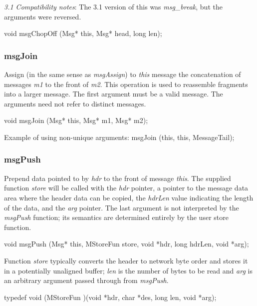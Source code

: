 {\em 3.1 Compatibility notes}:
The 3.1 version of this was {\em msg\_break}, but the arguments were reversed.
\medskip

{\sem void} {\bold msgChopOff} ({\sem Msg*} {\caps this}, {\sem Msg*} {\caps head}, {\sem long} {\caps len});
\medskip

\subsubsection{msgJoin}

Assign (in the same sense as {\em msgAssign}) 
to {\em this} message the concatenation of messages {\em m1}
to the front of {\em m2}. This operation is used to reassemble fragments
into a larger message.  The first argument must be a valid message.  The
arguments need not refer to distinct messages.
\medskip

{\sem void} {\bold msgJoin} ({\sem Msg*} {\caps this}, {\sem Msg*} {\caps m1}, {\sem Msg*} {\caps m2});
\medskip

Example of using non-unique arguments:
\medskip
{\bold msgJoin} ({\caps this},  {\caps this}, {\caps MessageTail});
\medskip

\subsubsection{msgPush}

Prepend data pointed to by {\em hdr} to the front of message {\em
this}.  The supplied function {\em store} will be called with the {\em
hdr} pointer, a pointer to the message data area where the header data
can be copied, the {\em hdrLen} value indicating the length of the
data, and the {\em arg} pointer.  The last argument is not interpreted
by the {\em msgPush} function; its semantics are determined entirely
by the user store function.
\medskip

{\sem void} {\bold msgPush} ({\sem Msg*} {\caps this}, {\sem MStoreFun} {\caps  store}, {\sem void} *{\caps hdr}, {\sem long} {\caps hdrLen}, {\sem void} *{\caps arg});
\medskip

Function {\em store} typically converts the header to network byte
order and stores it in a potentially unaligned buffer; {\em len} is
the number of bytes to be read and {\em arg} is an arbitrary argument
passed through from {\em msgPush}.
\medskip

{\sem typedef void} ({\bold *MStoreFun} )({\sem void} *{\caps hdr}, {\sem char} *{\caps des}, {\sem long} {\caps len}, {\sem void} *{\caps arg});
\medskip

